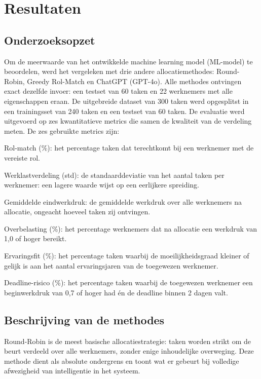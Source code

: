 \chapter{Resultaten}%
\label{ch:resultaten}
\section{Onderzoeksopzet}
\vspace{1em}Om de meerwaarde van het ontwikkelde machine learning model (ML-model) te beoordelen, werd het vergeleken met drie andere allocatiemethodes: Round-Robin, Greedy Rol-Match en ChatGPT (GPT-4o). Alle methodes ontvingen exact dezelfde invoer: een testset van 60 taken en 22 werknemers met alle eigenschappen eraan. De uitgebreide dataset van 300 taken werd opgesplitst in een trainingsset van 240 taken en een testset van 60 taken. De evaluatie werd uitgevoerd op zes kwantitatieve metrics die samen de kwaliteit van de verdeling meten. De zes gebruikte metrics zijn:

\vspace{0.5em}Rol-match (\%): het percentage taken dat terechtkomt bij een werknemer met de vereiste rol.

\vspace{0.5em}Werklastverdeling (std): de standaarddeviatie van het aantal taken per werknemer: een lagere waarde wijst op een eerlijkere spreiding.

\vspace{0.5em}Gemiddelde eindwerkdruk: de gemiddelde werkdruk over alle werknemers na allocatie, ongeacht hoeveel taken zij ontvingen.

\vspace{0.5em}Overbelasting (\%): het percentage werknemers dat na allocatie een werkdruk van 1,0 of hoger bereikt.

\vspace{0.5em}Ervaringsfit (\%): het percentage taken waarbij de moeilijkheidsgraad kleiner of gelijk is aan het aantal ervaringsjaren van de toegewezen werknemer.

\vspace{0.5em}Deadline-risico (\%): het percentage taken waarbij de toegewezen werknemer een beginwerkdruk van 0,7 of hoger had én de deadline binnen 2 dagen valt.

\section{Beschrijving van de methodes}
\vspace{1em}Round-Robin is de meest basische allocatiestrategie: taken worden strikt om de beurt verdeeld over alle werknemers, zonder enige inhoudelijke overweging. Deze methode dient als absolute ondergrens en toont wat er gebeurt bij volledige afwezigheid van intelligentie in het systeem.

